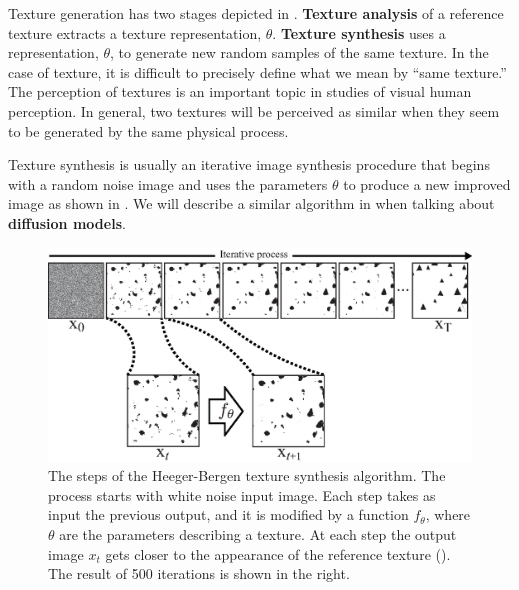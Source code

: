 {Texture generation has two stages depicted in \fig{\ref{fig:analysis_heeger_bergen}}. {\bf Texture analysis} of a reference texture extracts a texture representation, $\theta$. {\bf Texture synthesis} uses a representation, $\theta$, to generate new random samples of the same texture. In the case of texture, it is difficult to precisely define what we mean by ``same texture.'' The perception of textures is an important topic in studies of visual human perception. In general, two textures will be perceived as similar when they seem to be generated by the same physical process.


Texture synthesis is usually an iterative image synthesis procedure that begins with a random noise image and uses the parameters $\theta$ to produce a new improved image as shown in \fig{\ref{fig:heeger_bergen_iterations}}. 
We will describe a similar algorithm in \sect{\ref{sec:generative_models:diffusion_models}} when talking about {\bf diffusion models}.

\begin{figure}
\centerline{
\includegraphics[width=1\linewidth]{figures/heeger_bergen/heeger_bergen_iterations.eps}
}
\caption{The steps of the Heeger-Bergen texture synthesis algorithm. The process starts with white noise input image. Each step takes as input the previous output, and it is modified by a function $f_{\theta}$, where $\theta$ are the parameters describing a texture. At each step the output image $x_t$ gets closer to the appearance of the reference texture (\fig{\ref{fig:analysis_heeger_bergen}}). 
The result of 500 iterations is shown in the right.
}
\label{fig:heeger_bergen_iterations}
\end{figure}



}

